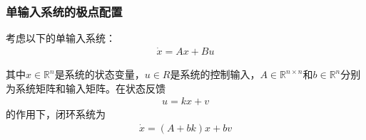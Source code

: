 \subsubsection{单输入系统的极点配置}

考虑以下的单输入系统：
\begin{align*}
    \dot{x} = Ax + Bu
\end{align*}

其中$x \in \mathbb{R}^n$是系统的状态变量，$u\in R$是系统的控制输入，$A\in \mathbb{R}^{n\times n}$和$b\in \mathbb{R}^n$分别为系统矩阵和输入矩阵。在状态反馈
\begin{align*}
    u = kx + v
\end{align*}
的作用下，闭环系统为
\begin{align*}
    \dot{x} = (A + bk) x + bv
\end{align*}

